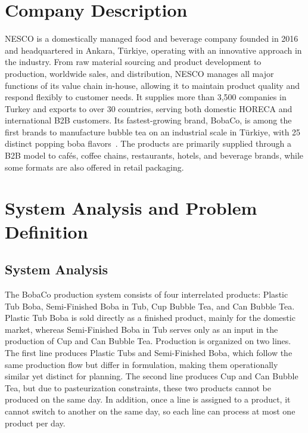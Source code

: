 \documentclass[nocoverpage]{buIE47xbooklet}
\begin{document}
\section{Company Description}
NESCO is a domestically managed food and beverage company founded in 2016 and headquartered in Ankara, Türkiye, operating with an innovative approach in the industry. From raw material sourcing and product development to production, worldwide sales, and distribution, NESCO manages all major functions of its value chain in-house, allowing it to maintain product quality and respond flexibly to customer needs. It supplies more than 3,500 companies in Turkey and exports to over 30 countries, serving both domestic HORECA and international B2B customers. Its fastest-growing brand, BobaCo, is among the first brands to manufacture bubble tea on an industrial scale in Türkiye, with 25 distinct popping boba flavors~\citep{BobaCo}. The products are primarily supplied through a B2B model to cafés, coffee chains, restaurants, hotels, and beverage brands, while some formats are also offered in retail packaging.

\section{System Analysis and Problem Definition}

\subsection{System Analysis}
The BobaCo production system consists of four interrelated products: Plastic Tub Boba, Semi-Finished Boba in Tub, Cup Bubble Tea, and Can Bubble Tea. Plastic Tub Boba is sold directly as a finished product, mainly for the domestic market, whereas Semi-Finished Boba in Tub serves only as an input in the production of Cup and Can Bubble Tea. Production is organized on two lines. The first line produces Plastic Tubs and Semi-Finished Boba, which follow the same production flow but differ in formulation, making them operationally similar yet distinct for planning. The second line produces Cup and Can Bubble Tea, but due to pasteurization constraints, these two products cannot be produced on the same day. In addition, once a line is assigned to a product, it cannot switch to another on the same day, so each line can process at most one product per day.
\end{document}
